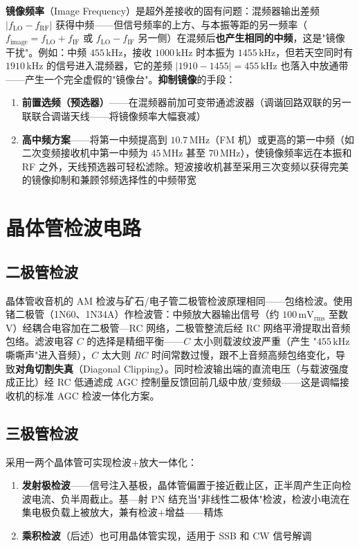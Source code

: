 \documentclass[12pt,UTF8]{ctexbook}
\begin{document}
\textbf{镜像频率}（Image Frequency）是超外差接收的固有问题：混频器输出差频 $|f_{\text{LO}} - f_{\text{RF}}|$ 获得中频——但信号频率的上方、与本振等距的另一频率（$f_{\text{image}} = f_{\text{LO}} + f_{\text{IF}}$ 或 $f_{\text{LO}} - f_{\text{IF}}$ 另一侧）在混频后\textbf{也产生相同的中频}，这是"镜像干扰"。例如：中频 $455\,\mathrm{kHz}$，接收 $1000\,\mathrm{kHz}$ 时本振为 $1455\,\mathrm{kHz}$，但若天空同时有 $1910\,\mathrm{kHz}$ 的信号进入混频器，它的差频 $|1910-1455|=455\,\mathrm{kHz}$ 也落入中放通带——产生一个完全虚假的"镜像台"。\textbf{抑制镜像}的手段：
\begin{enumerate}
\item \textbf{前置选频（预选器）}——在混频器前加可变带通滤波器（调谐回路双联的另一联联合调谐天线——将镜像频率大幅衰减）
\item \textbf{高中频方案}——将第一中频提高到 $10.7\,\mathrm{MHz}$（FM 机）或更高的第一中频（如二次变频接收机中第一中频为 $45\,\mathrm{MHz}$ 甚至 $70\,\mathrm{MHz}$），使镜像频率远在本振和 RF 之外，天线预选器可轻松滤除。短波接收机甚至采用三次变频以获得完美的镜像抑制和兼顾邻频选择性的中频带宽
\end{enumerate}

\section{晶体管检波电路}
\label{sec:transistor_detector}

\subsection{二极管检波}

晶体管收音机的 AM 检波与矿石/电子管二极管检波原理相同——包络检波。使用锗二极管（1N60、1N34A）作检波管：中频放大器输出信号（约 $100\,\mathrm{mV_{rms}}$ 至数 V）经耦合电容加在二极管—RC 网络，二极管整流后经 RC 网络平滑提取出音频包络。滤波电容 $C$ 的选择是精细平衡——$C$ 太小则载波纹波严重（产生 "$455\,\mathrm{kHz}$嘶嘶声"进入音频），$C$ 太大则 $RC$ 时间常数过慢，跟不上音频高频包络变化，导致\textbf{对角切割失真}（Diagonal Clipping）。同时检波输出端的直流电压（与载波强度成正比）经 RC 低通滤成 AGC 控制量反馈回前几级中放/变频级——这是调幅接收机的标准 AGC 检波一体化方案。

\subsection{三极管检波}

采用一两个晶体管可实现检波+放大一体化：
\begin{enumerate}
\item \textbf{发射极检波}——信号注入基极，晶体管偏置于接近截止区，正半周产生正向检波电流、负半周截止。基—射 PN 结充当"非线性二极体"检波，检波小电流在集电极负载上被放大，兼有检波+增益——精炼
\item \textbf{乘积检波}（后述）也可用晶体管实现，适用于 SSB 和 CW 信号解调
\end{enumerate}
\end{document}
